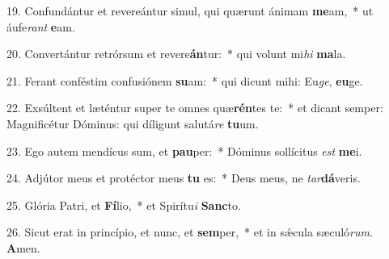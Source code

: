 19. Confundántur et revereántur simul, qui quærunt ánimam \textbf{me}am,~*  ut áufe\textit{rant} \textbf{e}am.\

20. Convertántur retrórsum et revere\textbf{án}tur:~*  qui volunt mi\textit{hi} \textbf{ma}la.\

21. Ferant conféstim confusiónem \textbf{su}am:~*  qui dicunt mihi: Eu\textit{ge}, \textbf{eu}ge.\

22. Exsúltent et læténtur super te omnes quæ\textbf{rén}tes te:~*  et dicant semper: Magnificétur Dóminus: qui díligunt salutá\textit{re} \textbf{tu}um.\

23. Ego autem mendícus sum, et \textbf{pau}per:~*  Dóminus sollícitus \textit{est} \textbf{me}i.\

24. Adjútor meus et protéctor meus \textbf{tu} es:~*  Deus meus, ne \textit{tar}\textbf{dá}veris.\

25. Glória Patri, et \textbf{Fí}lio,~*  et Spirítu\textit{i} \textbf{Sanc}to.\

26. Sicut erat in princípio, et nunc, et \textbf{sem}per,~*  et in sǽcula sæculó\textit{rum}. \textbf{A}men.\

